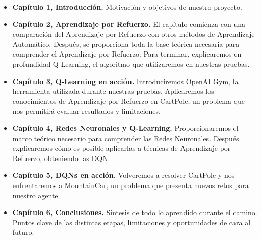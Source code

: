 \begin{itemize}
    \item \textbf{Capítulo 1, Introducción.} Motivación y objetivos de nuestro proyecto.
    \item \textbf{Capítulo 2, Aprendizaje por Refuerzo.} El capítulo comienza con una comparación del Aprendizaje por Refuerzo con otros métodos de Aprendizaje Automático. Después, se proporciona toda la base teórica necesaria para comprender el Aprendizaje por Refuerzo. Para terminar, explicaremos en profundidad Q-Learning, el algoritmo que utilizaremos en nuestras pruebas.
    \item \textbf{Capítulo 3, Q-Learning en acción.} Introduciremos OpenAI Gym, la herramienta utilizada durante nuestras pruebas. Aplicaremos los conocimientos de Aprendizaje por Refuerzo en CartPole, un problema que nos permitirá evaluar resultados y limitaciones.
    \item \textbf{Capítulo 4, Redes Neuronales y Q-Learning.} Proporcionaremos el marco teórico necesario para comprender las Redes Neuronales. Después explicaremos cómo es posible aplicarlas a técnicas de Aprendizaje por Refuerzo, obteniendo las DQN.
    \item \textbf{Capítulo 5, DQNs en acción.} Volveremos a resolver CartPole y nos enfrentaremos a MountainCar, un problema que presenta nuevos retos para nuestro agente.
    \item \textbf{Capítulo 6, Conclusiones.} Síntesis de todo lo aprendido durante el camino. Puntos clave de las distintas etapas, limitaciones y oportunidades de cara al futuro.
    
\end{itemize}
